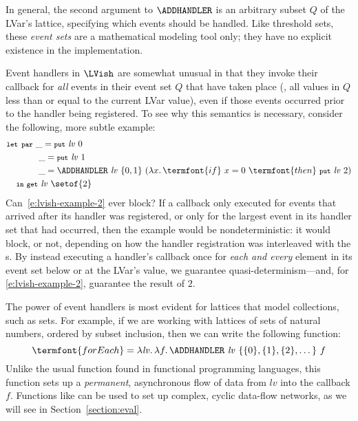 In general, the second argument to $\ADDHANDLER$ is an arbitrary subset $Q$ of the
LVar's lattice, specifying which events should be handled.  Like threshold
sets, these \emph{event sets} are a mathematical modeling tool only; they have no
explicit existence in the implementation.

Event handlers in $\LVish$ are somewhat unusual in that they invoke their
callback for \emph{all} events in their event set $Q$ that have taken place
(\ie, all values in $Q$ less than or equal to the current LVar value), even if
those events occurred prior to the handler being registered.  To see why
this semantics is necessary, consider the following, more subtle example:
\begin{equation}
\begin{split}
& \LETPAR ~\_ = \putexp{\mathit{lv}}{0} \\
&  \letparspace ~\_ = \putexp{\mathit{lv}}{1} \\
&  \letparspace ~\_ = \ADDHANDLER~\mathit{lv}~\{ 0, 1 \}~
     (\lam{x}{\termfont{if}~x=0~\termfont{then}~\putexp{\mathit{lv}}{2}}) \\
&  \letspace \IN~ \getexp{\mathit{lv}}{\setof{2}}
\end{split}
\label{e:lvish-example-2}
\end{equation}
Can~\ref{e:lvish-example-2} ever block?  If a callback only executed for events
that arrived after its handler was registered, or only for the largest event in
its handler set that had occurred, then the example would be nondeterministic:
it would block, or not, depending on how the handler registration was
interleaved with the s.  By instead executing a handler's callback once
for \emph{each and every} element in its event set below or at the LVar's value, we
guarantee quasi-determinism---and, for \ref{e:lvish-example-2}, guarantee the
result of $2$.

The power of event handlers is most evident for lattices that model collections,
such as sets.  For example, if we are working with lattices of sets of natural
numbers, ordered by subset inclusion, then 
we can write the following function:
\[
\termfont{forEach} = \lam{\mathit{lv}}{
  \lam{f}{
    \ADDHANDLER~\mathit{lv}~\{ \{0\}, \{1\}, \{2\}, \dots \}~f
  }}
\]
Unlike the usual  function found in functional programming
languages, this function sets up a \emph{permanent}, asynchronous flow of data
from $\mathit{lv}$ into the callback $f$.  Functions like  can
be used to set up complex, cyclic data-flow networks, as we will see in
Section~\ref{section:eval}.

